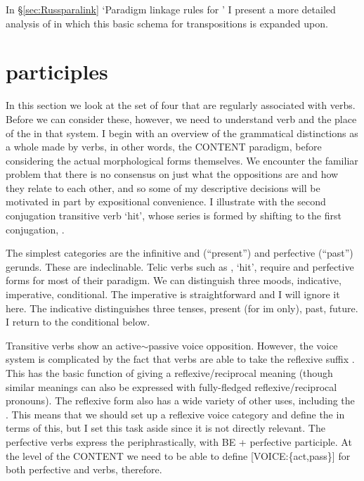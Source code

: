 \documentclass[output=paper,
modfonts
]{LSP/langsci}
\begin{document}
In \S\ref{sec:Russparalink} ‘Paradigm linkage rules for ’ I present a more detailed analysis of   in which this basic schema for transpositions is expanded upon.

\section{ participles}  \label{sec:Russianptcps}


In this section we look at the set of four  that are regularly associated with  verbs. Before we can consider these, however, we need to understand   verb  and the place of the  in that system. I begin with an overview of the grammatical distinctions as a whole made by verbs, in other words, the CONTENT paradigm, before considering the actual morphological forms themselves. We encounter the familiar problem that there is no consensus on  just what the oppositions are and how they relate to each other, and so some of my descriptive decisions will be motivated in part by expositional convenience. I illustrate with the second conjugation transitive verb  ‘hit’, whose   series is formed by shifting to the first conjugation, .  

%
The simplest categories are the infinitive and   (``present'') and perfective (``past'') gerunds. These are indeclinable. Telic verbs such as , ‘hit’, require  and perfective  forms for most of their paradigm. We can distinguish three moods, indicative, imperative, conditional. The imperative is straightforward and I will ignore it here. The indicative distinguishes three tenses, present (for im only), past, future. I return to the conditional below.
%

Transitive verbs show an active$\sim$passive voice opposition. However, the voice system is complicated by the fact that  verbs are able to take the reflexive suffix . This has the basic function of giving a reflexive/reciprocal meaning (though similar meanings can also be expressed with fully-fledged reflexive/reciprocal pronouns). The reflexive form also has a wide variety of other uses, including the  \parencite{Gerritsen90:book}. This means that we should set up a reflexive voice category and define the   in terms of this, but I set this task aside since it is not directly relevant. The perfective verbs express the   periphrastically, with BE + perfective  participle. At the level of the CONTENT  we need to be able to define [VOICE:\{act,pass\}] for both perfective and  verbs, therefore.  
\end{document}
